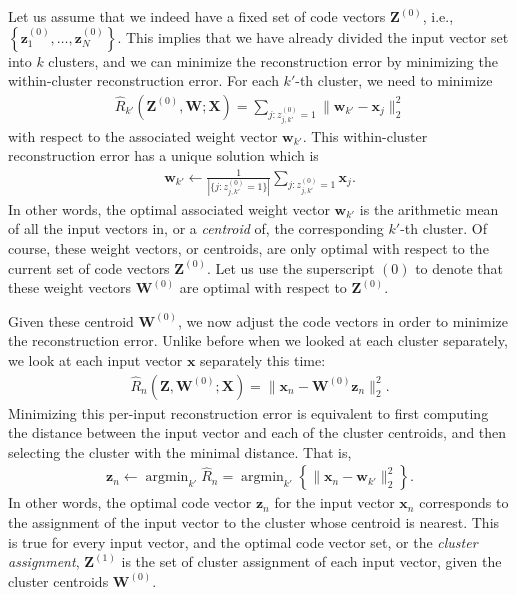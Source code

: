 \documentclass{report}
\newcommand{\vect}[1]{\mathbf{#1}}
\newcommand{\matr}[1]{\mathbf{#1}}
\newcommand{\vx}[0]{\vect{x}}
\newcommand{\vz}[0]{\vect{z}}
\newcommand{\vw}[0]{\vect{w}}
\newcommand{\mW}[0]{\matr{W}}
\newcommand{\mZ}[0]{\matr{Z}}
\newcommand{\mX}[0]{\matr{X}}
\DeclareMathOperator*{\argmin}{\arg \min}
\begin{document}
Let us assume that we indeed have a fixed set of code vectors $\mZ^{(0)}$, i.e.,
$\left\{ \vz_1^{(0)}, \ldots, \vz_N^{(0)} \right\}$. This implies that we have
already divided the input vector set into $k$ clusters, and we can minimize the
reconstruction error by minimizing the within-cluster reconstruction error. For
each $k'$-th cluster, we need to minimize
\begin{align*}
    \hat{R}_{k'}(\mZ^{(0)}, \mW; \mX) = 
    \sum_{j: z_{j,k'}^{(0)} = 1} \| \vw_{k'} - \vx_j \|_2^2
\end{align*}
with respect to the associated weight vector $\vw_{k'}$. This within-cluster
reconstruction error has a unique solution which is
\begin{align}
    \label{eq:km_max}
    \vw_{k'} \leftarrow \frac{1}{\left|
        \{j: z_{j,k'}^{(0)} = 1\}
    \right|} \sum_{j: z_{j,k'}^{(0)} = 1} \vx_j.
\end{align}
In other words, the optimal associated weight vector $\vw_{k'}$ is the
arithmetic mean of all the input vectors in, or a {\it centroid} of, the
corresponding $k'$-th cluster. Of course, these weight vectors, or centroids,
are only optimal with respect to the current set of code vectors $\mZ^{(0)}$.
Let us use the superscript $(0)$ to denote that these weight vectors $\mW^{(0)}$
are optimal with respect to $\mZ^{(0)}$.

Given these centroid $\mW^{(0)}$, we now adjust the code vectors in order to
minimize the reconstruction error. Unlike before when we looked at each cluster
separately, we look at each input vector $\vx$ separately this time:
\begin{align*}
    \hat{R}_n(\mZ, \mW^{(0)}; \mX) =
    \| \vx_n - \mW^{(0)} \vz_n \|_2^2.
\end{align*}
Minimizing this per-input reconstruction error is equivalent to first computing
the distance between the input vector and each of the cluster centroids, and
then selecting the cluster with the minimal distance. That is,
\begin{align}
    \label{eq:km_exp}
    \vz_n \leftarrow 
    \argmin_{k'} \hat{R}_n = \argmin_{k'} 
    \left\{
        \| \vx_n - \vw_{k'}\|_2^2
    \right\}.
\end{align}
In other words, the optimal code vector $\vz_n$ for the input vector $\vx_n$
corresponds to the assignment of the input vector to the cluster whose
centroid is nearest.  This is true for every input vector, and the optimal code
vector set, or the {\it cluster assignment}, $\mZ^{(1)}$ is the set of cluster
assignment of each input vector, given the cluster centroids $\mW^{(0)}$. 
\end{document}
